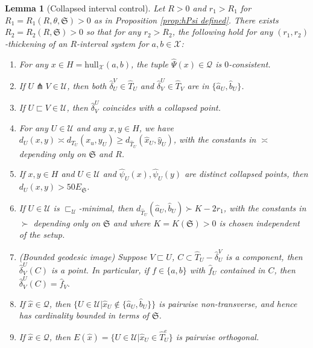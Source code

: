 \documentclass{amsart}
\newtheorem{lemma}[theorem]{Lemma}
\theoremstyle{definition}
\theoremstyle{remark}
\theoremstyle{definition}
\newcommand{\calQ}{\mathcal{Q}}
\newcommand{\calU}{\mathcal{U}}
\newcommand{\calX}{\mathcal{X}}
\newcommand{\hT}{\widehat{T}}
\newcommand{\hx}{\hat{x}}
\newcommand{\ha}{\hat{a}}
\newcommand{\hb}{\hat{b}}
\newcommand{\hy}{\hat{y}}
\newcommand{\hd}{\hat{\delta}}
\newcommand{\hpsi}{\hat{\psi}}
\newcommand{\hPsi}{\widehat{\Psi}}
\newcommand{\hf}{\hat{f}}
\newcommand{\ES}{E_{\mathfrak S}}
\newcommand{\hull}{\mathrm{hull}}
\newcommand{\nest}{\sqsubset}
\begin{document}
\begin{lemma}[Collapsed interval control]\label{lem:collapsed interval control}
Let $R>0$ and $r_1 > R_1$ for $R_1 = R_1(R,\theta, \mathfrak S)>0$ as in Proposition \ref{prop:hPsi defined}.  There exists $R_2 = R_2(R,\mathfrak S)>0$ so that for any $r_2>R_2$, the following hold for any $(r_1,r_2)$-thickening of an $R$-interval system for $a,b \in \calX$: 
\begin{enumerate}
    \item For any $x \in H = \hull_{\calX}(a,b)$, the tuple $\hPsi(x) \in \calQ$ is $0$-consistent.
    
    \item If $U \pitchfork V \in \calU$, then both $\hd^V_U \in \hT_U$ and $\hd^U_V \in \hT_V$ are in $\{\ha_U, \hb_U\}$.
    
    \item If $U \nest V \in \calU$, then $\hd^U_V$ coincides with a collapsed point.
    
    \item For any $U \in \calU$ and any $x,y \in H$, we have $d_U(x,y) \asymp d_{T_U}(x_u,y_U)\geq d_{\hT_U}(\hx_U,\hy_U)$, with the constants in $\asymp$ depending only on $\mathfrak S$ and $R$.
  
    
    \item If $x,y \in H$ and $U \in \calU$ and $\hpsi_U(x), \hpsi_U(y)$ are distinct collapsed points, then $d_U(x,y) > 50\ES$.
    
    \item If $U \in \calU$ is $\nest_{\calU}$-minimal, then $d_{\hT_U}(\ha_U,\hb_U) \succ K - 2r_1$, with the constants in $\succ$ depending only on $\mathfrak S$ and where $K = K(\mathfrak S)>0$ is chosen independent of the setup.
    
    \item (Bounded geodesic image) Suppose $V \nest U$, $C \subset \hT_U - \hd^V_U$ is a component, then $\hd^U_V(C)$ is a point.  In particular, if $f \in \{a,b\}$ with $\hf_U$ contained in $C$, then $\hd^U_V(C) = \hf_V.$

 \item If $\hx \in \calQ$, then $\{U \in \calU| \hx_U \notin \{\ha_U,\hb_U\}\}$ is pairwise non-transverse, and hence has cardinality bounded in terms of $\mathfrak S$.
   
    
    \item If $\hx \in \calQ$, then $E(\hx) = \{U \in \calU| \hx_U \in \hT^e_U\}$ is pairwise orthogonal.
    
   
\end{enumerate}
\end{lemma}
\end{document}
